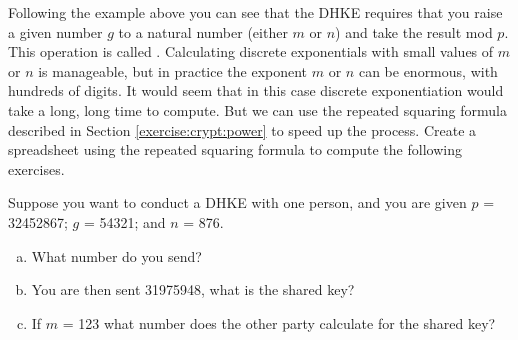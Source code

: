 

Following the example above you can see that the DHKE requires that you raise a given number $g$ to a natural number (either $m$ or $n$) and take the result mod $p$. This operation is called . Calculating discrete exponentials with small values of $m$ or $n$ is manageable, but in practice the exponent $m$ or $n$ can be enormous, with hundreds of digits. It would seem that in this case discrete exponentiation would take a long, long time to compute.  But we can use the repeated squaring formula described in Section \ref{exercise:crypt:power} to speed up the process.  Create a spreadsheet using the repeated squaring formula to compute the following exercises.
 
\begin{exer}
Suppose you want to conduct a DHKE with one person, and you are given $p$ = 32452867; $g$ = 54321; and $n$ = 876.  
\begin{enumerate}[(a)]
\item What number do you send?  

\item You are then sent 31975948, what is the shared key? 

\item If $m$ = 123 what number does the other party calculate for the shared key?
\end{enumerate}
\end{exer}

